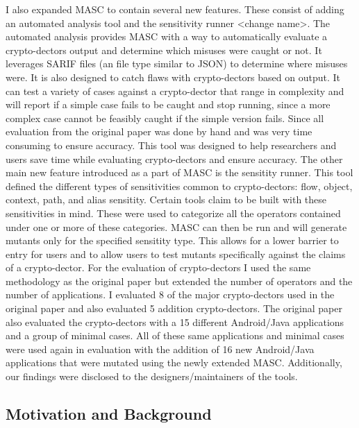 I also expanded MASC to contain several new features. These consist of adding an automated analysis tool and the sensitivity runner <change name>. The automated analysis provides MASC with a way to automatically evaluate a crypto-dectors output and determine which misuses were caught or not. It leverages SARIF files (an file type similar to JSON) to determine where misuses were. It is also designed to catch flaws with crypto-dectors based on output. It can test a variety of cases against a crypto-dector that range in complexity and will report if a simple case fails to be caught and stop running, since a more complex case cannot be feasibly caught if the simple version fails. Since all evaluation from the original paper was done by hand and was very time consuming to ensure accuracy. This tool was designed to help researchers and users save time while evaluating crypto-dectors and ensure accuracy. 
The other main new feature introduced as a part of MASC is the sensitity runner. This tool defined the different types of sensitivities  common to crypto-dectors: flow, object, context, path, and alias sensitity. Certain tools claim to be built with these sensitivities in mind. These were used to categorize all the operators contained under one or more of these categories. MASC can then be run and will generate mutants only for the specified sensitity type. This allows for a lower barrier to entry for users and to allow users to test mutants specifically against the claims of a crypto-dector. 
For the evaluation of crypto-dectors I used the same methodology as the original paper but extended the number of operators and the number of applications. I evaluated 8 of the major crypto-dectors used in the original paper and also evaluated 5 addition crypto-dectors. The original paper also evaluated the crypto-dectors with a 15 different Android/Java applications and a group of minimal cases. All of these same applications and minimal cases were used again in evaluation with the addition of 16 new Android/Java applications that were mutated using the newly extended MASC. Additionally, our findings were disclosed to the designers/maintainers of the tools. 


\subsection{Motivation and Background}
\label{ch1:subsec:motivation}

